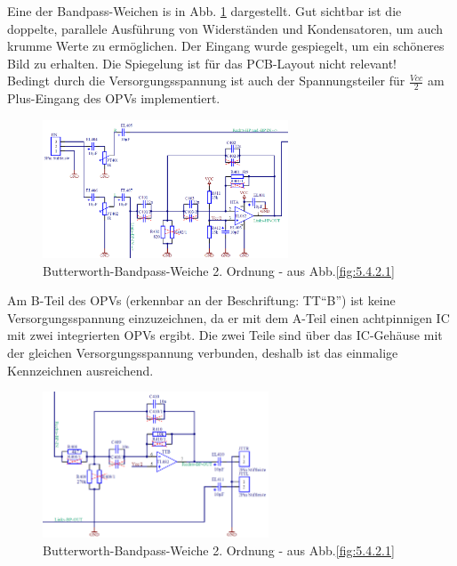 \newpage
Eine der Bandpass-Weichen is in Abb. \ref{fig:5.4.2.2} dargestellt.
Gut sichtbar ist die doppelte, parallele Ausführung von Widerständen und Kondensatoren, um auch krumme Werte zu ermöglichen.
Der Eingang wurde gespiegelt, um ein schöneres Bild zu erhalten.
Die Spiegelung ist für das PCB-Layout nicht relevant!\\
Bedingt durch die Versorgungsspannung ist auch der Spannungsteiler für $\frac{Vcc}{2}$ am Plus-Eingang des OPVs implementiert.
\begin{figure} [H]
	\centering	
	\includegraphics[width=0.65\textwidth]{img/Print4/4_TTuHTWeiche-LinksHP-Schematic.PNG}
	\caption{Butterworth-Bandpass-Weiche 2. Ordnung - aus Abb.\ref{fig:5.4.2.1}}
	\label {fig:5.4.2.2}
\end{figure}
Am B-Teil des OPVs (erkennbar an der Beschriftung: TT\enquote{B}) ist keine Versorgungsspannung einzuzeichnen, da er mit dem A-Teil einen achtpinnigen IC mit zwei integrierten OPVs ergibt.
Die zwei Teile sind über das IC-Gehäuse mit der gleichen Versorgungsspannung verbunden, deshalb ist das einmalige Kennzeichnen ausreichend.\\
\begin{figure} [H]
	\centering	
	\includegraphics[width=0.6\textwidth]{img/Print4/4_TTuHTWeiche-RechtsBP-Schematic.PNG}
	\caption{Butterworth-Bandpass-Weiche 2. Ordnung - aus Abb.\ref{fig:5.4.2.1}}
	\label {fig:5.4.2.3}
\end{figure}

